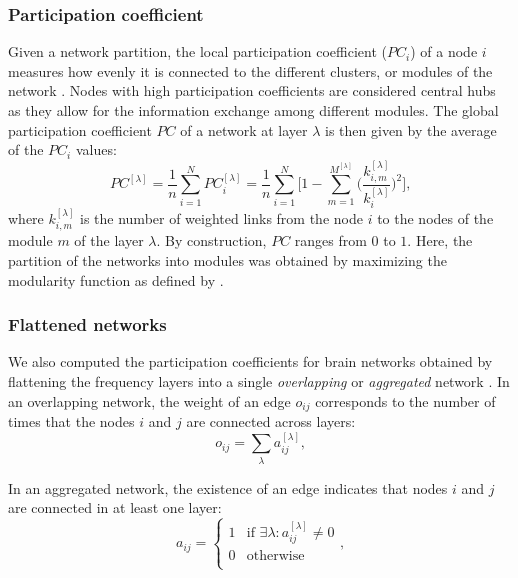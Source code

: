 \subsubsection{Participation coefficient} \label{subsec:pc}

Given a network partition, the local participation coefficient ($PC_i$) of a node $i$ measures how evenly it is connected to the different clusters, or modules of the network \citep{guimera_cartography_2005}.
Nodes with high participation coefficients are considered central hubs as they allow for the information exchange among different modules.
The global participation coefficient $PC$ of a network at layer $\lambda$  is then given by the average of the $PC_i$ values:
\begin{equation}
	PC^{[\lambda]} 	= \frac{1}{n} \sum_{i=1}^{N} PC_i^{[\lambda]}
	=  \frac{1}{n} \sum_{i=1}^{N} \Bigg[ 1-\sum_{m=1}^{M^{[\lambda]}} \Bigg( \frac{k_{i,m}^{[\lambda]}}{k_i^{[\lambda]}} \Bigg)^2 \Bigg] \text{,}
	\label{eq:pc}
\end{equation}
where $k_{i,m}^{[\lambda]}$ is the number of weighted links from the node $i$ to the nodes of the module $m$ of the layer $\lambda$. By construction, $PC$ ranges from $0$ to $1$.
Here, the partition of the networks into modules was obtained by maximizing the modularity function as defined by \cite{newman_finding_2006}.

\subsubsection{Flattened networks} \label{subsec:flattening}

We also computed the participation coefficients for brain networks obtained by flattening the frequency layers into a single \textit{overlapping}  or \textit{aggregated} network \citep{battiston_structural_2014}.
In an overlapping network, the weight of an edge $o_{ij}$ corresponds to the number of times that the nodes $i$ and $j$ are connected across layers:
\begin{equation}
	o_{ij} = \sum_{\lambda} a_{ij}^{[\lambda]} \text{,}
	\label{eq:overlapping}
\end{equation}

In an aggregated network, the existence of an edge indicates that nodes $i$ and $j$ are connected in at least one layer:
\begin{equation}
	a_{ij} = \left\{
	\begin{array}{ll}
		1 & \text{if } \exists{\lambda} : a_{ij}^{[\lambda]} \ne 0 \\
		0 & \text{otherwise}                                       \\
	\end{array}
	\right. \text{,}
	\label{eq:aggregated}
\end{equation}

